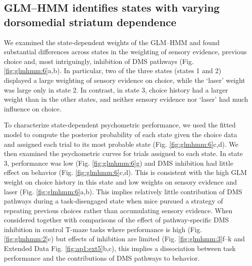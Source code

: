\subsection{GLM–HMM identifies states with varying dorsomedial striatum dependence}
\label{sec:glmhmm:2.2.8}

We examined the state-dependent weights of the GLM–HMM and found substantial differences across states in the weighting of sensory evidence, previous choice and, most intriguingly, inhibition of DMS pathways (Fig. \ref{fig:glmhmm:6}a,b). In particular, two of the three states (states 1 and 2) displayed a large weighting of sensory evidence on choice, while the ‘laser’ weight was large only in state 2. In contrast, in state 3, choice history had a larger weight than in the other states, and neither sensory evidence nor ‘laser’ had much influence on choice.

To characterize state-dependent psychometric performance, we used the fitted model to compute the posterior probability of each state given the choice data and assigned each trial to its most probable state (Fig. \ref{fig:glmhmm:6}c,d). We then examined the psychometric curves for trials assigned to each state. In state 3, performance was low (Fig. \ref{fig:glmhmm:6}g) and DMS inhibition had little effect on behavior (Fig. \ref{fig:glmhmm:6}c,d). This is consistent with the high GLM weight on choice history in this state and low weights on sensory evidence and laser (Fig. \ref{fig:glmhmm:6}a,b). This implies relatively little contribution of DMS pathways during a task-disengaged state when mice pursued a strategy of repeating previous choices rather than accumulating sensory evidence. When considered together with comparisons of the effect of pathway-specific DMS inhibition in control T-maze tasks where performance is high (Fig. \ref{fig:glmhmm:2}c) but effects of inhibition are limited (Fig. \ref{fig:glmhmm:3}f–k and Extended Data Fig. \ref{fig:ap1:ext5}b,c), this implies a dissociation between task performance and the contributions of DMS pathways to behavior.

